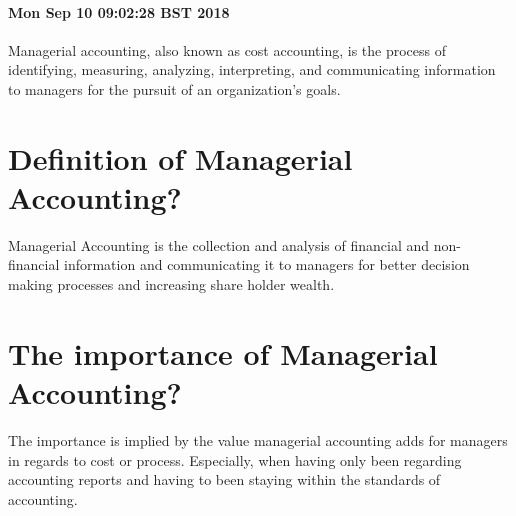 \documentclass{article}
\begin{document}







\begin{center}

 \paragraph{Mon Sep 10 09:02:28 BST 2018} 

\end{center}

Managerial accounting, also known as cost accounting, is the process of identifying, measuring, analyzing, interpreting, and communicating information to managers for the pursuit of an organization's goals.

\section{Definition of Managerial Accounting?}

Managerial Accounting is the collection and analysis of financial and non-financial information and communicating it to managers for better decision making processes and increasing share holder wealth.

\section{The importance of Managerial Accounting?}

The importance is implied by the value managerial accounting adds for managers in regards to cost or process. 
Especially, when having only been regarding accounting reports and having to been staying within the standards of accounting.
\end{document}
